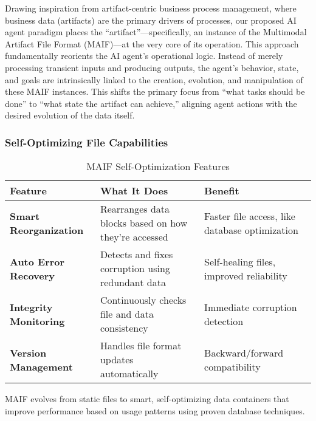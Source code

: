 \documentclass[conference]{IEEEtran}
\begin{document}
Drawing inspiration from artifact-centric business process management, where business data (artifacts) are the primary drivers of processes, our proposed AI agent paradigm places the ``artifact''---specifically, an instance of the Multimodal Artifact File Format (MAIF)---at the very core of its operation\cite{ref10}. This approach fundamentally reorients the AI agent's operational logic. Instead of merely processing transient inputs and producing outputs, the agent's behavior, state, and goals are intrinsically linked to the creation, evolution, and manipulation of these MAIF instances. This shifts the primary focus from ``what tasks should be done'' to ``what state the artifact can achieve,'' aligning agent actions with the desired evolution of the data itself\cite{ref12}.

\subsubsection{Self-Optimizing File Capabilities}

\begin{table*}[!t]
\renewcommand{\arraystretch}{1.3}
\caption{MAIF Self-Optimization Features}
\label{tab:self-optimization}
\centering
\footnotesize
\begin{tabular}{p{3.5cm}p{5cm}p{4.5cm}}
\toprule
\textbf{Feature} & \textbf{What It Does} & \textbf{Benefit} \\
\midrule
\textbf{Smart Reorganization} & Rearranges data blocks based on how they're accessed & Faster file access, like database optimization \\
\textbf{Auto Error Recovery} & Detects and fixes corruption using redundant data & Self-healing files, improved reliability \\
\textbf{Integrity Monitoring} & Continuously checks file and data consistency & Immediate corruption detection \\
\textbf{Version Management} & Handles file format updates automatically & Backward/forward compatibility \\
\bottomrule
\end{tabular}
\end{table*}

MAIF evolves from static files to smart, self-optimizing data containers that improve performance based on usage patterns using proven database techniques.
\end{document}
